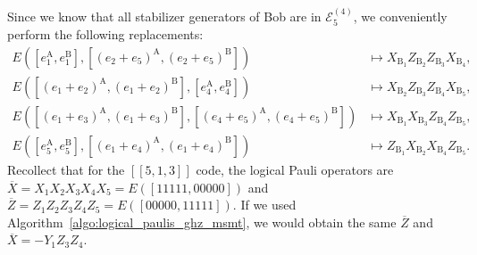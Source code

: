 \documentclass[journal,onecolumn]{IEEEtran}
\newcommand{\llbr}{[\![}
\newcommand{\rrbr}{]\!]}
\begin{document}
Since we know that all stabilizer generators of Bob are in $\mathcal{E}_5^{(4)}$, we conveniently perform the following replacements:
\begin{align}
E([e_1^{\text{A}}, e_1^{\text{B}}],[(e_2+e_5)^{\text{A}}, (e_2+e_5)^{\text{B}}]) & \mapsto X_{\text{B}_1} Z_{\text{B}_2} Z_{\text{B}_3} X_{\text{B}_4}, \nonumber \\
%
E([(e_1+e_2)^{\text{A}}, (e_1+e_2)^{\text{B}}], [e_4^{\text{A}}, e_4^{\text{B}}]) & \mapsto X_{\text{B}_2} Z_{\text{B}_3} Z_{\text{B}_4} X_{\text{B}_5}, \nonumber \\
%
E([(e_1+e_3)^{\text{A}}, (e_1+e_3)^{\text{B}}], [(e_4+e_5)^{\text{A}}, (e_4+e_5)^{\text{B}}]) & \mapsto X_{\text{B}_1} X_{\text{B}_3} Z_{\text{B}_4} Z_{\text{B}_5}, \nonumber \\
%
E([e_5^{\text{A}}, e_5^{\text{B}}],[(e_1+e_4)^{\text{A}}, (e_1+e_4)^{\text{B}}]) & \mapsto Z_{\text{B}_1} X_{\text{B}_2} X_{\text{B}_4} Z_{\text{B}_5}.
\end{align}
Recollect that for the $\llbr 5,1,3 \rrbr$ code, the logical Pauli operators are $\overline{X} = X_1 X_2 X_3 X_4 X_5 = E([11111,00000])$ and $\overline{Z} = Z_1 Z_2 Z_3 Z_4 Z_5 = E([00000,11111])$.
If we used Algorithm~\ref{algo:logical_paulis_ghz_msmt}, we would obtain the same $\overline{Z}$ and $\overline{X} = - Y_1 Z_3 Z_4$.
\end{document}

